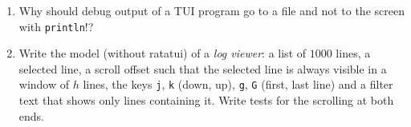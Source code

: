 \begin{enumerate}[label=\textbf{\thechapter.\arabic*}]
  \item Why should debug output of a TUI program go to a file and not to the screen with \verb!println!!?
  \item[\textbf{\thechapter.10}$\star$] Write the model (without ratatui) of a \emph{log viewer}: a list of $1000$ lines, a selected line, a scroll offset such that the selected line is always visible in a window of $h$ lines, the keys \verb!j!, \verb!k! (down, up), \verb!g!, \verb!G! (first, last line) and a filter text that shows only lines containing it. Write tests for the scrolling at both ends.
\end{enumerate}
